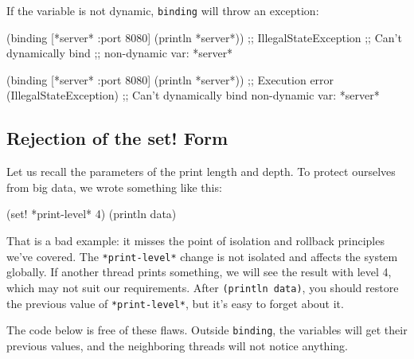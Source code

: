 \fi

\noindent
If the variable is not dynamic, \verb|binding| will throw an exception:

\ifx\DEVICETYPE\MOBILE

\begin{english}
  \begin{clojure}
(binding [*server* {:port 8080}]
  (println *server*))
;; IllegalStateException
;; Can't dynamically bind
;; non-dynamic var: *server*
  \end{clojure}
\end{english}

\else

\begin{english}
  \begin{clojure}
(binding [*server* {:port 8080}]
  (println *server*))
;; Execution error (IllegalStateException)
;; Can't dynamically bind non-dynamic var: *server*
  \end{clojure}
\end{english}

\fi

\subsection{Rejection of the set! Form}

Let us recall the parameters of the print length and depth. To protect ourselves from big data, we wrote something like this:

\begin{english}
  \begin{clojure}
(set! *print-level* 4)
(println data)
  \end{clojure}
\end{english}


That is a bad example: it misses the point of isolation and rollback principles we've covered.
The \verb|*print-level*| change is not isolated and affects the system globally.
If another thread prints something, we will see the result with level 4, which may not suit our requirements.
After \verb|(println data)|, you should restore the previous value of \verb|*print-level*|, but it's easy to forget about it.

The code below is free of these flaws.
Outside \verb|binding|, the variables will get their previous values, and the neighboring threads will not notice anything.

\ifx\DEVICETYPE\MOBILE

